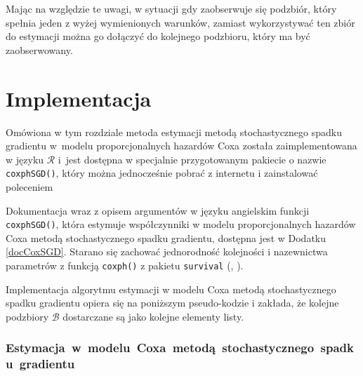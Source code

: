 Mając na względzie te uwagi, w sytuacji gdy zaobserwuje się podzbiór, który spełnia jeden z wyżej wymienionych warunków, zamiast wykorzystywać ten zbiór do estymacji można go dołączyć do kolejnego podzbioru, który ma być zaobserwowany.

\newpage
\section{Implementacja}\label{implemento}

Omówiona w tym rozdziale metoda estymacji metodą stochastycznego spadku gradientu w~modelu proporcjonalnych hazardów Coxa została zaimplementowana w języku $\mathcal{R}$ i~jest dostępna w specjalnie przygotowanym pakiecie o nazwie \texttt{coxphSGD()}, który można jednocześnie pobrać z internetu i zainstalować poleceniem
\begin{Shaded}
\begin{Highlighting}[]
\NormalTok{(}\NormalTok{)}
\end{Highlighting}
\end{Shaded}

Dokumentacja wraz z opisem argumentów w języku angielskim funkcji \texttt{coxphSGD()}, która estymuje współczynniki w modelu
proporcjonalnych hazardów Coxa metodą stochastycznego spadku gradientu, dostępna jest w Dodatku \ref{docCoxSGD}.
Starano się zachować jednorodność kolejności i nazewnictwa parametrów z funkcją \texttt{coxph()} z pakietu \texttt{survival} (\cite{ther}, \cite{survival}).

Implementacja algorytmu estymacji w modelu Coxa metodą stochastycznego spadku gradientu opiera się na poniższym pseudo-kodzie i zakłada, że kolejne podzbiory \(\mathcal{B}\) dostarczane są jako kolejne elementy listy.
\subsubsection{Estymacja~w~modelu~Coxa~metodą~stochastycznego~spadku~gradientu}


